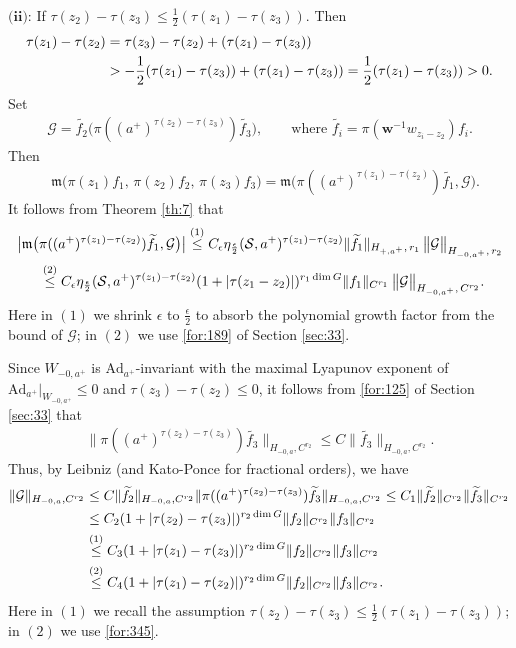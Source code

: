 \documentclass[11 pt]{amsart}
\newcommand{\norm}[1]{\lVert#1\rVert}
\theoremstyle{definition}
\numberwithin{equation}{section}
\begin{document}
\smallskip
$\textbf{(ii)}$: If $\tau(z_{2})-\tau(z_{3})\leq\frac{1}{2}(\tau(z_1)-\tau(z_3))$. Then
\begin{align}\label{for:345}
 \tau(z_1)-\tau(z_2)&=\tau(z_3)-\tau(z_2)+(\tau(z_1)-\tau(z_3))\notag\\
 &>-\frac{1}{2}(\tau(z_1)-\tau(z_3))+(\tau(z_1)-\tau(z_3))=\frac{1}{2}(\tau(z_1)-\tau(z_3))>0.
\end{align}
Set
\begin{align*}
\mathcal{G}=\widetilde{f_2} \big(\pi((a^+)^{\tau(z_2)-\tau(z_3)})\widetilde{f_3}\big),\qquad\text{where }\widetilde{f_i}=\pi(\textbf{w}^{-1}w_{z_i-z_2})f_i.
\end{align*}
Then
\begin{align}\label{for:347}
&\mathfrak{m}\big(\pi(z_1)f_1,\,\pi(z_2)f_2,\, \pi(z_3)f_{3}\big)=\mathfrak{m}\big(\pi((a^+)^{\tau(z_1)-\tau(z_2)})\widetilde{f_1},\mathcal{G}\big).
\end{align}
It follows from Theorem \ref{th:7} that
\begin{align}\label{for:346}
 \big|\mathfrak{m}\big(&\pi((a^+)^{\tau(z_1)-\tau(z_2)})\widetilde{f_1},\mathcal{G}\big)\big|\overset{\text{(1)}}{\leq} C_\epsilon \eta_{\frac{\epsilon}{2}}(\mathcal{S}, a^+)^{\tau(z_1)-\tau(z_2)}\norm{\widetilde{f_1}}_{H_{+,a^+},\,r_1}\,\big\|\mathcal{G}\big\|_{H_{-0,a^+},\,r_2}\notag\\
 &\overset{\text{(2)}}{\leq} C_\epsilon \eta_{\frac{\epsilon}{2}}(\mathcal{S}, a^+)^{\tau(z_1)-\tau(z_2)}(1+|\tau(z_1-z_2)|)^{r_1\dim G}\norm{f_1}_{C^{r_1}}\,\big\|\mathcal{G}\big\|_{H_{-0,a^+},\,C^{r_2}}.
\end{align}
Here in $(1)$ we shrink $\epsilon$ to $\frac{\epsilon}{2}$ to absorb the polynomial growth factor  from the bound of $\mathcal{G}$; in $(2)$ we use \eqref{for:189} of Section \ref{sec:33}.

Since $W_{-0,a^+}$ is $\text{Ad}_{a^+}$-invariant with the maximal Lyapunov exponent of $\text{Ad}_{a^+}|_{W_{-0,a^+}}\leq0$ and $\tau(z_3)-\tau(z_{2})\leq 0$,
it follows from
\eqref{for:125} of Section \ref{sec:33} that
\begin{align*}
 \|\pi((a^+)^{\tau(z_2)-\tau(z_3)})\widetilde{f_3}\|_{H_{-0,a},C^{r_2}}\leq C\|\widetilde{f_3}\|_{H_{-0,a},C^{r_2}}.
\end{align*}
Thus, by Leibniz
(and Kato-Ponce for fractional orders), we have
\begin{align*}
\|\mathcal G\|_{H_{-0,a},C^{r_2}}&\leq C  \|\widetilde{f_2}\|_{H_{-0,a},C^{r_2}}\|\pi((a^+)^{\tau(z_2)-\tau(z_3)})\widetilde{f_3}\|_{H_{-0,a},C^{r_2}}\leq C_1\|\widetilde{f_2}\|_{C^{r_2}}\|\widetilde{f_3}\|_{C^{r_2}}\\
&\le C_2(1+|\tau(z_2)-\tau(z_3)|)^{r_2\dim G}\|f_2\|_{C^{r_2}}\|f_3\|_{C^{r_2}}\notag\\
&\overset{\text{(1)}}{\leq} C_3(1+|\tau(z_1)-\tau(z_3)|)^{r_2\dim G}\|f_2\|_{C^{r_2}}\|f_3\|_{C^{r_2}}\notag\\
&\overset{\text{(2)}}{\leq} C_4(1+|\tau(z_1)-\tau(z_2)|)^{r_2\dim G}\|f_2\|_{C^{r_2}}\|f_3\|_{C^{r_2}}.
\end{align*}
Here in $(1)$ we recall the assumption $\tau(z_{2})-\tau(z_{3})\leq\frac{1}{2}(\tau(z_1)-\tau(z_3))$; in $(2)$ we use \eqref{for:345}.
\end{document}
